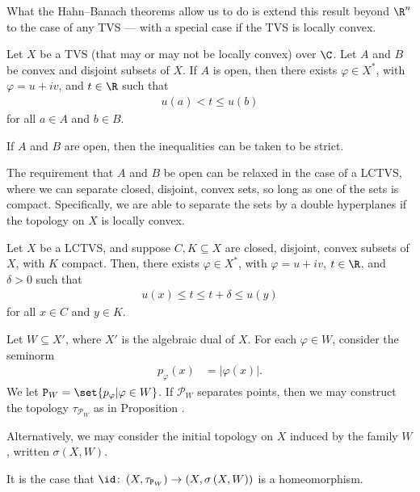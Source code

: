 What the Hahn--Banach theorems allow us to do is extend this result beyond $\R^n$ to the case of any TVS --- with a special case if the TVS is locally convex.
\begin{theorem}\label{thm:hb_separation_tvs}
  Let $X$ be a TVS (that may or may not be locally convex) over $\C$. Let $A$ and $B$ be convex and disjoint subsets of $X$. If $A$ is open, then there exists $\varphi\in X^{\ast}$, with $\varphi = u + iv$, and $t\in \R$ such that
  \begin{align*}
    u(a) < t \leq u(b)
  \end{align*}
  for all $a\in A$ and $b\in B$.\newline

  If $A$ and $B$ are open, then the inequalities can be taken to be strict.
\end{theorem}
The requirement that $A$ and $B$ be open can be relaxed in the case of a LCTVS, where we can separate closed, disjoint, convex sets, so long as one of the sets is compact. Specifically, we are able to separate the sets by a double hyperplanes if the topology on $X$ is locally convex.
\begin{theorem}\label{thm:hb_separation_lctvs}
  Let $X$ be a LCTVS, and suppose $C,K\subseteq X$ are closed, disjoint, convex subsets of $X$, with $K$ compact. Then, there exists $\varphi\in X^{\ast}$, with $\varphi = u + iv$, $t\in \R$, and $\delta > 0$ such that
  \begin{align*}
    u(x) \leq t \leq t + \delta \leq u(y)
  \end{align*}
  for all $x\in C$ and $y\in K$.
\end{theorem}
\begin{proposition}
  Let $W\subseteq X'$, where $X'$ is the algebraic dual of $X$. For each $\varphi\in W$, consider the seminorm
  \begin{align*}
    p_{\varphi}(x) &= \left\vert \varphi(x) \right\vert.
  \end{align*}
  We let $\mathcal{P}_{W} = \set{p_{\varphi} | \varphi\in W}$. If $\mathcal{P}_{W}$ separates points, then we may construct the topology $\tau_{\mathcal{P}_{W}}$ as in Proposition \label{prop:structure_of_lctvs}.\newline

  Alternatively, we may consider the initial topology on $X$ induced by the family $W$, written $\sigma\left(X,W\right)$.\newline

  It is the case that $\id\colon \left(X,\tau_{\mathcal{P}_{W}}\right)\rightarrow \left(X,\sigma\left(X,W\right)\right)$ is a homeomorphism.
\end{proposition}
